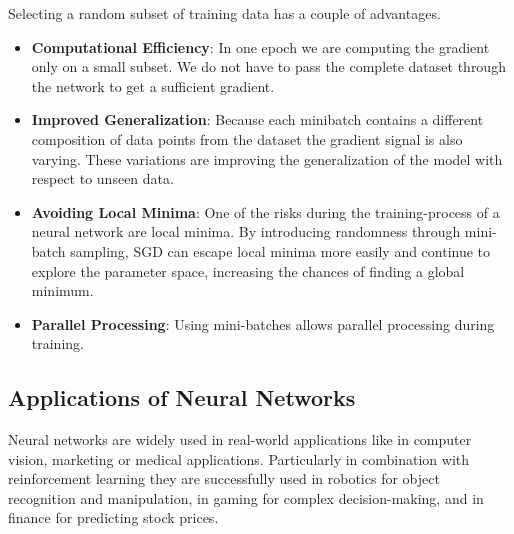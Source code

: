 Selecting a random subset of training data has a couple of advantages. 
\begin{itemize}
	\item \textbf{Computational Efficiency}: In one epoch we are computing the gradient only on a small subset. We do not have to pass the complete dataset through the network to get a sufficient gradient.
	\item \textbf{Improved Generalization}: Because each minibatch contains a different composition of data points from the dataset the gradient signal is also varying. These variations are improving the generalization of the model with respect to unseen data.
	\item \textbf{Avoiding Local Minima}: One of the risks during the training-process of a neural network are local minima. By introducing randomness through mini-batch sampling, SGD can escape local minima more easily and continue to explore the parameter space, increasing the chances of finding a global minimum.
	\item \textbf{Parallel Processing}: Using mini-batches allows parallel processing during training. 
\end{itemize}



\subsection{Applications of Neural Networks}


Neural networks are widely used in real-world applications like in computer vision, marketing or medical applications. Particularly in combination with reinforcement learning they are successfully used in robotics for object recognition and manipulation, in gaming for complex decision-making, and in finance for predicting stock prices.

% 


